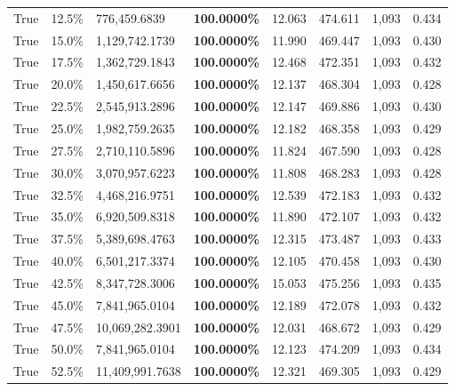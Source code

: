 \begin{table}[H]
\begin{tabular}{lllrllll}
\cline{1-8}
True & 12.5\% & 776,459.6839 & \bfseries \color{red} 100.0000\% & 12.063 & 474.611 & 1,093 & 0.434 \\
\cline{1-8}
True & 15.0\% & 1,129,742.1739 & \bfseries \color{red} 100.0000\% & 11.990 & 469.447 & 1,093 & 0.430 \\
\cline{1-8}
True & 17.5\% & 1,362,729.1843 & \bfseries \color{red} 100.0000\% & 12.468 & 472.351 & 1,093 & 0.432 \\
\cline{1-8}
True & 20.0\% & 1,450,617.6656 & \bfseries \color{red} 100.0000\% & 12.137 & 468.304 & 1,093 & 0.428 \\
\cline{1-8}
True & 22.5\% & 2,545,913.2896 & \bfseries \color{red} 100.0000\% & 12.147 & 469.886 & 1,093 & 0.430 \\
\cline{1-8}
True & 25.0\% & 1,982,759.2635 & \bfseries \color{red} 100.0000\% & 12.182 & 468.358 & 1,093 & 0.429 \\
\cline{1-8}
True & 27.5\% & 2,710,110.5896 & \bfseries \color{red} 100.0000\% & 11.824 & 467.590 & 1,093 & 0.428 \\
\cline{1-8}
True & 30.0\% & 3,070,957.6223 & \bfseries \color{red} 100.0000\% & 11.808 & 468.283 & 1,093 & 0.428 \\
\cline{1-8}
True & 32.5\% & 4,468,216.9751 & \bfseries \color{red} 100.0000\% & 12.539 & 472.183 & 1,093 & 0.432 \\
\cline{1-8}
True & 35.0\% & 6,920,509.8318 & \bfseries \color{red} 100.0000\% & 11.890 & 472.107 & 1,093 & 0.432 \\
\cline{1-8}
True & 37.5\% & 5,389,698.4763 & \bfseries \color{red} 100.0000\% & 12.315 & 473.487 & 1,093 & 0.433 \\
\cline{1-8}
True & 40.0\% & 6,501,217.3374 & \bfseries \color{red} 100.0000\% & 12.105 & 470.458 & 1,093 & 0.430 \\
\cline{1-8}
True & 42.5\% & 8,347,728.3006 & \bfseries \color{red} 100.0000\% & 15.053 & 475.256 & 1,093 & 0.435 \\
\cline{1-8}
True & 45.0\% & 7,841,965.0104 & \bfseries \color{red} 100.0000\% & 12.189 & 472.078 & 1,093 & 0.432 \\
\cline{1-8}
True & 47.5\% & 10,069,282.3901 & \bfseries \color{red} 100.0000\% & 12.031 & 468.672 & 1,093 & 0.429 \\
\cline{1-8}
True & 50.0\% & 7,841,965.0104 & \bfseries \color{red} 100.0000\% & 12.123 & 474.209 & 1,093 & 0.434 \\
\cline{1-8}
True & 52.5\% & 11,409,991.7638 & \bfseries \color{red} 100.0000\% & 12.321 & 469.305 & 1,093 & 0.429 \\

\end{tabular}
\end{table}
